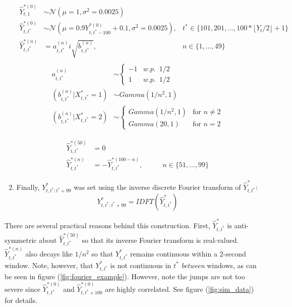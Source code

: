 \begin{enumerate}
	\begin{align*}
    	\hat{Y}^{*(0)}_{t,1} &\sim \mathcal{N} \left(\mu = 1, \sigma^2 = 0.0025 \right) & \\
    	\hat{Y}^{*(0)}_{t,t^*} &\sim \mathcal{N} \left(\mu = 0.9 Y^{*(0)}_{t,t^*-100} + 0.1, \sigma^2 = 0.0025 \right), & t^* \in \{101,201,\ldots, 100*\lfloor Y_t/2 \rfloor + 1\} \\
    	\hat{Y}^{*(n)}_{t,t^*} &= a_{t,t^*}^{(n)} i\sqrt{b^{(n)}_{t,t^*}}, & n \in \{1,\ldots,49\} \\
	\end{align*}
	\begin{align*}
	    a_{t,t^*}^{(n)} &\sim  \left\{\begin{array}{lr}
    	-1 & w.p. \enspace 1/2 \\
    	1  & w.p. \enspace 1/2
    	\end{array}\right. \\
    	(b^{(n)}_{t,t^*}|X^*_{t,t^*}  = 1) &\sim Gamma(1/n^2, 1) \\
    	(b^{(n)}_{t,t^*}|X^*_{t,t^*} = 2) &\sim \left\{\begin{array}{lr}
    	Gamma(1/n^2, 1) & \text{for } n \neq 2\\
    	Gamma(20,1) & \text{for } n = 2
    	\end{array}\right. 
	\end{align*}

    \begin{align*}
        \hat{Y}^{*(50)}_{t,t^*} &= 0 & \\
    	\hat{Y}^{*(n)}_{t,t^*}  &= -\hat{Y}^{*(100-n)}_{t,t^*}, & \qquad n \in \{51,\ldots,99\}
    \end{align*}
	
	\item Finally, $Y^*_{t,t^*:t^*+99}$ was set using the inverse discrete Fourier transform of $\hat{Y}^*_{t,t^*}$:
	$$Y^*_{t,t^*:t^*+99} = IDFT\left(\hat{Y}^*_{t,t^*}\right)$$
		
\end{enumerate}

There are several practical reasons behind this construction. First, $\hat{Y}^*_{t,t^*}$ is anti-symmetric about $\hat{Y}^{*(50)}_{t,t^*}$ so that its inverse Fourier transform is real-valued. $\hat{Y}^{*(n)}_{t,t^*}$ also decays like $1/n^2$ so that $Y^*_{t,t^*}$ remains continuous within a 2-second window. Note, however, that $Y^*_{t,t^*}$ is not continuous in $t^*$ \textit{between} windows, as can be seen in figure (\ref{fig:fourier_example}). However, note the jumps are not too severe since $\hat{Y}^{*(0)}_{t,t^*}$ and $\hat{Y}^{*(0)}_{t,t^*+100}$ are highly correlated. See figure (\ref{fig:sim_data}) for details.

